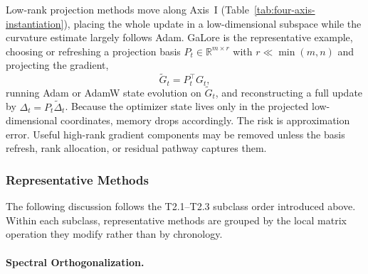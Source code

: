 Low-rank projection methods move along Axis~I
(Table~\ref{tab:four-axis-instantiation}), placing the whole update in a
low-dimensional subspace while the curvature estimate largely follows Adam.
GaLore is the representative example, choosing or refreshing a projection basis
$P_t\in\mathbb{R}^{m\times r}$ with $r\ll\min(m,n)$ and projecting the gradient,
\begin{equation}
  \widetilde{G}_t=P_t^\top G_t,
  \label{eq:t2-galore-project}
\end{equation}
running Adam or AdamW state evolution on $\widetilde{G}_t$, and reconstructing a
full update by $\Delta_t=P_t\widetilde{\Delta}_t$.  Because the optimizer state
lives only in the projected low-dimensional coordinates, memory drops
accordingly.  The risk is approximation error.  Useful high-rank gradient
components may be removed unless the basis refresh, rank allocation, or residual
pathway captures them.

\subsubsection{Representative Methods}
\label{sec:t2-methods}

The following discussion follows the T2.1--T2.3 subclass order introduced
above.  Within each subclass, representative methods are grouped by the local
matrix operation they modify rather than by chronology.

\paragraph{Spectral Orthogonalization.}
\label{sec:t2-spectral}

